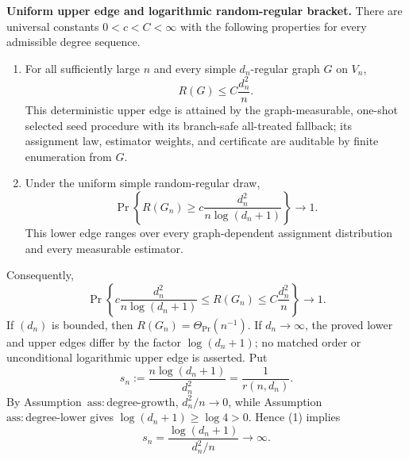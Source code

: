 \textbf{Uniform upper edge and logarithmic random-regular bracket.}
There are universal constants \(0<c<C<\infty\) with the following properties for every admissible degree sequence.
\begin{enumerate}
\item For all sufficiently large \(n\) and every simple \(d_n\)-regular graph \(G\) on \(V_n\),
\[
R(G)\le C\frac{d_n^2}{n}.
\]
This deterministic upper edge is attained by the graph-measurable, one-shot selected seed procedure with its branch-safe all-treated fallback; its assignment law, estimator weights, and certificate are auditable by finite enumeration from \(G\).
\item Under the uniform simple random-regular draw,
\[
\Pr\!\left\{R(G_n)\ge c\frac{d_n^2}{n\log(d_n+1)}\right\}\longrightarrow1.
\]
This lower edge ranges over every graph-dependent assignment distribution and every measurable estimator.
\end{enumerate}
Consequently,
\[
\Pr\!\left\{
c\frac{d_n^2}{n\log(d_n+1)}
\le R(G_n)\le
C\frac{d_n^2}{n}
\right\}\longrightarrow1.
\]
If \((d_n)\) is bounded, then \(R(G_n)=\Theta_{\Pr}(n^{-1})\).  If \(d_n\to\infty\), the proved lower and upper edges differ by the factor \(\log(d_n+1)\); no matched order or unconditional logarithmic upper edge is asserted.
Put
\[
s_n:=\frac{n\log(d_n+1)}{d_n^2}=\frac{1}{r(n,d_n)}.
\tag{1}
\]
By Assumption~\(\mathrm{ass{:}degree\mbox{-}growth}\), \(d_n^2/n\to0\), while Assumption~\(\mathrm{ass{:}degree\mbox{-}lower}\) gives \(\log(d_n+1)\ge\log4>0\).  Hence (1) implies
\[
s_n=\frac{\log(d_n+1)}{d_n^2/n}\longrightarrow\infty.
\tag{2}
\]

